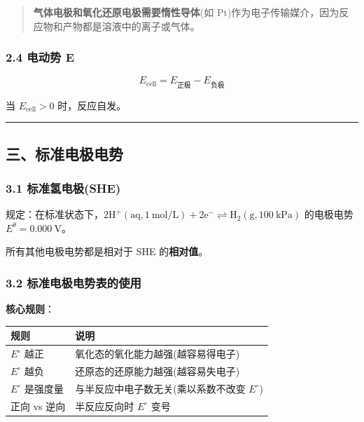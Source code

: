 \documentclass[a4paper,11pt]{ctexart}
\newcounter{none}
\newcommand{\箭}{\ensuremath{\rightarrow}}
\newcommand{\左箭}{\ensuremath{\leftarrow}}
\newcommand{\上箭}{\ensuremath{\uparrow}}
\newcommand{\下箭}{\ensuremath{\downarrow}}
\newcommand{\衡}{\ensuremath{\rightleftharpoons}}
\newcommand{\双箭}{\ensuremath{\leftrightarrow}}
\newcommand{\约等于}{\ensuremath{\approx}}
\newcommand{\小于等于}{\ensuremath{\leq}}
\newcommand{\大于等于}{\ensuremath{\geq}}
\newcommand{\不等于}{\ensuremath{\neq}}
\newcommand{\西格马}{\ensuremath{\sigma}}
\newcommand{\派}{\ensuremath{\pi}}
\begin{document}
\begin{quote}
\textbf{气体电极和氧化还原电极需要惰性导体}(如 Pt)作为电子传输媒介，因为反应物和产物都是溶液中的离子或气体。
\end{quote}

\subsubsection{2.4 电动势 E}\label{ux7535ux52a8ux52bf-e}

\[
E_{\text{cell}} = E_{\text{正极}} - E_{\text{负极}}
\]

当 \(E_{\text{cell}} > 0\) 时，反应自发。

\begin{center}\rule{0.5\linewidth}{0.5pt}\end{center}

\subsection{三、标准电极电势}\label{ux4e09ux6807ux51c6ux7535ux6781ux7535ux52bf}

\subsubsection{3.1 标准氢电极(SHE)}\label{ux6807ux51c6ux6c22ux7535ux6781she}

规定：在标准状态下，\(2\mathrm{H^+(aq, 1\ mol/L) + 2e^- \rightleftharpoons H_2(g, 100\ kPa)}\) 的电极电势 \(E^\theta = 0.000\ \mathrm{V}\)。

所有其他电极电势都是相对于 SHE 的\textbf{相对值}。

\subsubsection{3.2 标准电极电势表的使用}\label{ux6807ux51c6ux7535ux6781ux7535ux52bfux8868ux7684ux4f7fux7528}

\textbf{核心规则}：

{\def\LTcaptype{none} %
\begin{longtable}[]{@{}
  >{\raggedright\arraybackslash}p{}
  >{\raggedright\arraybackslash}p{}@{}}
\toprule\noalign{}
\begin{minipage}[b]{\linewidth}\raggedright
规则
\end{minipage} & \begin{minipage}[b]{\linewidth}\raggedright
说明
\end{minipage} \\
\midrule\noalign{}
\endhead
\bottomrule\noalign{}
\endlastfoot
\(E^{\circ}\) 越正 & 氧化态的氧化能力越强(越容易得电子) \\
\(E^{\circ}\) 越负 & 还原态的还原能力越强(越容易失电子) \\
\(E^{\circ}\) 是强度量 & 与半反应中电子数无关(乘以系数不改变 \(E^{\circ}\)) \\
正向 vs 逆向 & 半反应反向时 \(E^{\circ}\) 变号 \\
\end{longtable}
}
\end{document}
